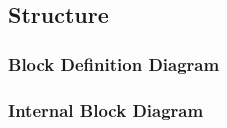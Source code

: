 \subsection{Structure}

\subsubsection{Block Definition Diagram}

\subsubsection{Internal Block Diagram}